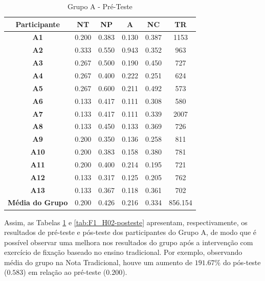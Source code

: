 \begin{table}[htbp]
	\centering
	\caption{Grupo A - Pré-Teste}		
	\begin{tabular}{|c|c|c|c|c|c|}
		\hline
		\rowcolor[HTML]{C0C0C0} 
		\textbf{Participante} & \textbf{NT} & \textbf{NP} & \textbf{A} & \textbf{NC} & \textbf{TR} \\ \hline
		\textbf{A1} & 0.200 & 0.383 & 0.130 & 0.387 & 1153 \\ \hline
		\rowcolor[HTML]{EFEFEF} 
		\textbf{A2} & 0.333 & 0.550 & 0.943 & 0.352 & 963 \\ \hline
		\textbf{A3} & 0.267 & 0.500 & 0.190 & 0.450 & 727 \\ \hline
		\rowcolor[HTML]{EFEFEF} 
		\textbf{A4} & 0.267 & 0.400 & 0.222 & 0.251 & 624 \\ \hline
		\textbf{A5} & 0.267 & 0.600 & 0.211 & 0.492 & 573 \\ \hline
		\rowcolor[HTML]{EFEFEF} 
		\textbf{A6} & 0.133 & 0.417 & 0.111 & 0.308 & 580 \\ \hline
		\textbf{A7} & 0.133 & 0.417 & 0.111 & 0.339 & 2007 \\ \hline
		\rowcolor[HTML]{EFEFEF} 
		\textbf{A8} & 0.133 & 0.450 & 0.133 & 0.369 & 726 \\ \hline
		\textbf{A9} & 0.200 & 0.350 & 0.136 & 0.258 & 811 \\ \hline
		\rowcolor[HTML]{EFEFEF} 
		\textbf{A10} & 0.200 & 0.383 & 0.158 & 0.380 & 781 \\ \hline
		\textbf{A11} & 0.200 & 0.400 & 0.214 & 0.195 & 721 \\ \hline
		\rowcolor[HTML]{EFEFEF} 
		\textbf{A12} & 0.133 & 0.317 & 0.125 & 0.205 & 762 \\ \hline
		\textbf{A13} & 0.133 & 0.367 & 0.118 & 0.361 & 702 \\ \hline
		\rowcolor[HTML]{EFEFEF} 
		\textbf{Média do Grupo} & 0.200 & 0.426 & 0.216 & 0.334 & 856.154 \\ \hline
	\end{tabular}
	\label{tab:F1_H02-preteste}
\end{table}

Assim, as Tabelas \ref{tab:F1_H02-preteste} e \ref{tab:F1_H02-posteste} apresentam, respectivamente, os resultados de pré-teste e pós-teste dos participantes do Grupo A, de modo que é possível observar uma melhora nos resultados do grupo após a intervenção com exercício de fixação baseado no ensino tradicional. Por exemplo, observando média do grupo na Nota Tradicional, houve um aumento de $191.67\%$ do pós-teste ($0.583$) em relação ao pré-teste ($0.200$).

